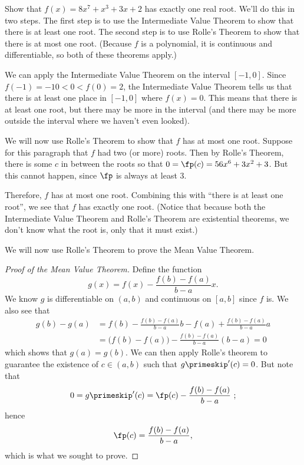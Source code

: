 \begin{example}\label{ex_rolle1}
Show that $f(x)=8x^7+x^3+3x+2$ has exactly one real root.
\solution
We'll do this in two steps.  The first step is to use the Intermediate Value Theorem to show that there is at least one root.  The second step is to use Rolle's Theorem to show that there is at most one root.  (Because $f$ is a polynomial, it is continuous and differentiable, so both of these theorems apply.)

We can apply the Intermediate Value Theorem on the interval $[-1,0]$.  Since $f(-1)=-10<0<f(0)=2$, the Intermediate Value Theorem tells us that there is at least one place in $[-1,0]$ where $f(x)=0$.  This means that there is at least one root, but there may be more in the interval (and there may be more outside the interval where we haven't even looked).

We will now use Rolle's Theorem to show that $f$ has at most one root. Suppose for this paragraph that $f$ had two (or more) roots. Then by Rolle's Theorem, there is some $c$ in between the roots so that $0=\fp(c)=56x^6+3x^2+3$. But this cannot happen, since $\fp$ is always at least 3.

Therefore, $f$ has at most one root.  Combining this with ``there is at least one root'', we see that $f$ has exactly one root.  (Notice that because both the Intermediate Value Theorem and Rolle's Theorem are existential theorems, we don't know what the root is, only that it must exist.)
\end{example}

We will now use Rolle's Theorem to prove the Mean Value Theorem.

\begin{proof}[Proof of the Mean Value Theorem]
Define the function
\[g(x) = f(x) - \frac{f(b)-f(a)}{b-a}x.\]
We know $g$ is differentiable on $(a,b)$ and  continuous on $[a,b]$ since $f$ is.  We also see that
\begin{align*}
g(b)-g(a)&=f(b)-\frac{f(b)-f(a)}{b-a}b-f(a)+\frac{f(b)-f(a)}{b-a}a\\
&=\bigl(f(b)-f(a)\bigr)-\frac{f(b)-f(a)}{b-a}(b-a)=0
\end{align*}
which shows that $g(a)=g(b)$. We can then apply Rolle's theorem to guarantee the existence of $c \in (a,b)$ such that $g\primeskip'(c) = 0$.  But note that
\[0= g\primeskip'(c) = \fp(c) - \frac{f(b)-f(a)}{b-a} \ ;\]
hence
\[\fp(c) = \frac{f(b)-f(a)}{b-a},\]
which is what we sought to prove.
\end{proof}

